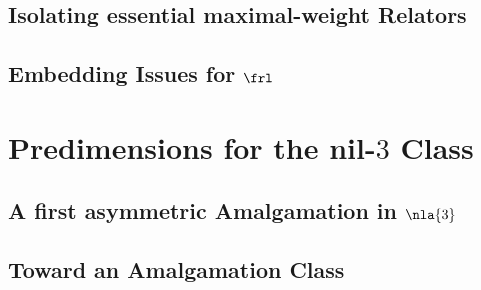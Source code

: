\documentclass[a4paper,twoside,10pt,ngerman,english]{report}
\begin{document}
\subsection{Isolating essential maximal-weight Relators}\label{maxrels}

\subsection{Embedding Issues for $\frl$}\label{embiss}


\section{Predimensions for the nil-$3$ Class}\label{preditre}

\subsection{A first asymmetric Amalgamation in $\nla{3}$}

\subsection{Toward an Amalgamation Class}\label{classetre}



\newpage\thispagestyle{empty}
\cleardoublepage

%
\newpage\thispagestyle{empty}~\newpage\thispagestyle{empty}
%


\end{document}
